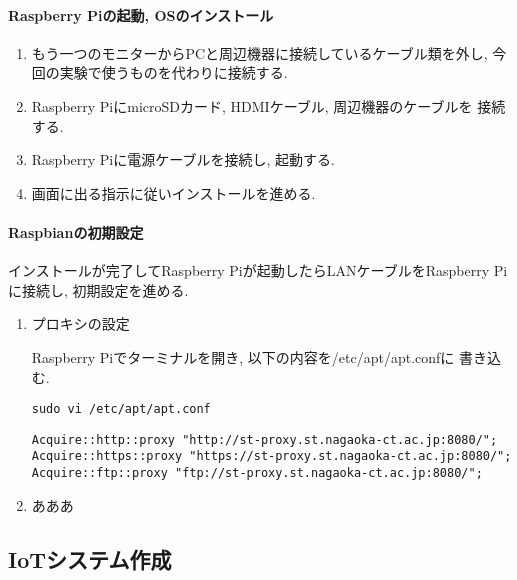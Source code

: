 \documentclass[titlepage]{jsarticle}
\begin{document}
            \paragraph{Raspberry Piの起動, OSのインストール}
                \begin{enumerate}
                    \item もう一つのモニターからPCと周辺機器に接続しているケーブル類を外し,
                        今回の実験で使うものを代わりに接続する.
                    \item Raspberry PiにmicroSDカード, HDMIケーブル, 周辺機器のケーブルを
                        接続する.
                    \item Raspberry Piに電源ケーブルを接続し, 起動する.
                    \item 画面に出る指示に従いインストールを進める.
                \end{enumerate}

            \paragraph{Raspbianの初期設定}
                インストールが完了してRaspberry Piが起動したらLANケーブルをRaspberry Pi
                に接続し, 初期設定を進める.

                \begin{enumerate}
                    \item プロキシの設定
                    
                        Raspberry Piでターミナルを開き, 以下の内容を/etc/apt/apt.confに
                        書き込む.
                            
                    \verb|sudo vi /etc/apt/apt.conf|

                        \begin{lstlisting}[caption=apt.conf]
Acquire::http::proxy "http://st-proxy.st.nagaoka-ct.ac.jp:8080/";
Acquire::https::proxy "https://st-proxy.st.nagaoka-ct.ac.jp:8080/";
Acquire::ftp::proxy "ftp://st-proxy.st.nagaoka-ct.ac.jp:8080/";
                        \end{lstlisting}
                    \item あああ
                \end{enumerate}

    \subsection{IoTシステム作成}
\end{document}
